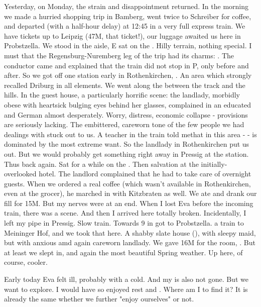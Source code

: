\documentclass{article}
\begin{document}
Yesterday, on Monday, the strain and disappointment returned. In the morning we made a hurried shopping trip in Bamberg, went twice to Schreiber for coffee, and departed (with a half-hour delay) at 12:45 in a very full express train. We have tickets up to Leipzig (47M, that ticket!), our luggage awaited us here in Probstzella. We stood in the aisle, E sat on the . Hilly terrain, nothing special. I must  that the Regensburg-Nuremberg leg of the trip had its charms: . The conductor came and explained that the train did not stop in P, only before and after. So we got off one station early in Rothenkirchen, . An area which strongly recalled Driburg in all elements. We went along the  between the track and the hills. In the guest house, a particularly horrific scene: the landlady, morbidly obese with heartsick bulging eyes behind her glasses, complained in an educated and  German almost desperately. Worry, distress, economic collapse - provisions are seriously lacking. The embittered, careworn tone of the few people we had dealings with stuck out to us. A teacher in the train told methat in this area -  - is dominated by the most extreme want. So the landlady in Rothenkirchen put us out. But we would probably get something right away in Pressig at the station. Thus back again. Sat for a while on the . Then salvation  at the initially-overlooked hotel. The landlord complained that he had to take care of overnight guests. When we ordered a real coffee (which wasn't available in Rothenkirchen, even at the grocer), he marched in with Kitzbraten as well. We ate and drank our fill for 15M. But
my nerves were at an end. When I lost Eva before the incoming train, there was a scene. And then I arrived here totally broken. Incidentally, I left my pipe in Pressig. Slow train. Towards 9 in got to Probstzella.  a train to Meininger Hof, and we took that here. A shabby slate house (), with sleepy maid, but with anxious amd again careworn landlady. We gave 16M for the room, . But at least we slept in, and again the most beautiful Spring weather. Up here, of course, cooler.

Early today Eva felt ill, probably with a cold. And my  is also not gone. But we want to explore. I would have so enjoyed rest and . Where am I to find it? It is already the same whether we further "enjoy ourselves" or not.
\end{document}
